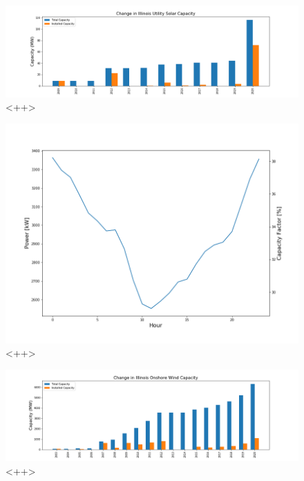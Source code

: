 \begin{figure}[ht]
	\centering
	\includegraphics[width=\columnwidth]{./img/cap/solar.png}
	\caption{<++>}
	\label{fig:<++>}
\end{figure}

\begin{figure}[ht]
	\centering
	\includegraphics[width=\columnwidth]{./img/cap/wind_cf.png}
	\caption{<++>}
	\label{fig:<++>}
\end{figure}

\begin{figure}[ht]
	\centering
	\includegraphics[width=\columnwidth]{./img/cap/onshore_wind.png}
	\caption{<++>}
	\label{fig:<++>}
\end{figure}

